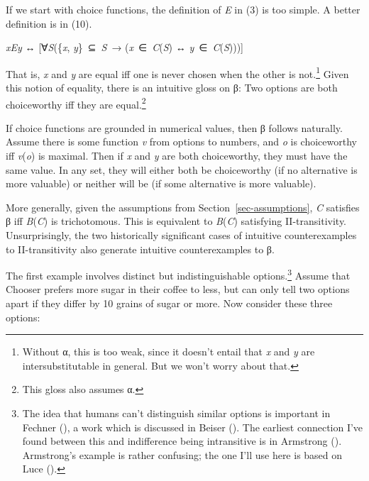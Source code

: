 \documentclass[
  10.5pt,
  twoside]{article}
\providecommand{\tightlist}{%
  \setlength{\itemsep}{0pt}\setlength{\parskip}{0pt}}
\let\oldenumerate\enumerate
\let\endoldenumerate\endenumerate
\renewenvironment{enumerate}
  {\vskip 5pt\oldenumerate}
  {\endoldenumerate\vskip 5pt}
\begin{document}
If we start with choice functions, the definition of \emph{E} in (3) is
too simple. A better definition is in (10).

\begin{enumerate}
\def\labelenumi{(\arabic{enumi})}
\setcounter{enumi}{9}
\tightlist
\item
  \emph{xEy} ↔ {[}∀\emph{S}(\{\emph{x}, \emph{y}\}~⊆~\emph{S}~→
  (\emph{x}~∈~\emph{C}(\emph{S}) ↔ \emph{y}~∈~\emph{C}(\emph{S}))){]}
\end{enumerate}

That is, \emph{x} and \emph{y} are equal iff one is never chosen when
the other is not.\footnote{Without α, this is too weak, since it doesn't
  entail that \emph{x} and \emph{y} are intersubstitutable in general.
  But we won't worry about that.} Given this notion of equality, there
is an intuitive gloss on β: Two options are both choiceworthy iff they
are equal.\footnote{This gloss also assumes α.}

If choice functions are grounded in numerical values, then β follows
naturally. Assume there is some function \emph{v} from options to
numbers, and \emph{o} is choiceworthy iff \emph{v}(\emph{o}) is maximal.
Then if \emph{x} and \emph{y} are both choiceworthy, they must have the
same value. In any set, they will either both be choiceworthy (if no
alternative is more valuable) or neither will be (if some alternative is
more valuable).

More generally, given the assumptions from
Section~\ref{sec-assumptions}, \emph{C} satisfies β iff
\emph{B}(\emph{C}) is trichotomous. This is equivalent to
\emph{B}(\emph{C}) satisfying II-transitivity. Unsurprisingly, the two
historically significant cases of intuitive counterexamples to
II-transitivity also generate intuitive counterexamples to β.

The first example involves distinct but indistinguishable
options.\footnote{The idea that humans can't distinguish similar options
  is important in Fechner (), a work
  which is discussed in Beiser (). The
  earliest connection I've found between this and indifference being
  intransitive is in Armstrong ().
  Armstrong's example is rather confusing; the one I'll use here is
  based on Luce ().} Assume that Chooser
prefers more sugar in their coffee to less, but can only tell two
options apart if they differ by 10 grains of sugar or more. Now consider
these three options:
\end{document}
